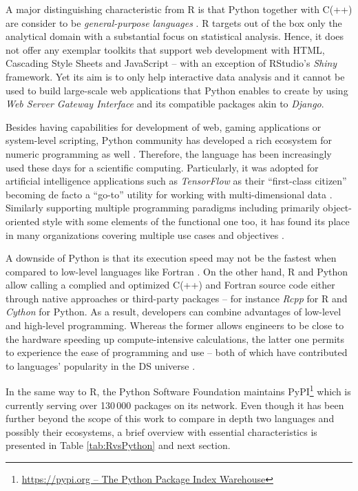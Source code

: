 A major distinguishing characteristic from R is that Python together with C(++) are consider to be \emph{general-purpose languages} \parencite{Cass2017,TeachingDS2016}.
R targets out of the box only the analytical domain with a substantial focus on statistical analysis. 
Hence, it does not offer any exemplar toolkits that support web development with \ac{HTML}, Cascading Style Sheets and JavaScript -- with an exception of RStudio's \emph{Shiny} framework. 
Yet its aim is to only help interactive data analysis and it cannot be used to build large-scale web applications that Python enables to create by using \emph{Web Server Gateway Interface} and its compatible packages akin to \emph{Django}.

Besides having capabilities for development of web, gaming applications or system-level scripting, Python community has developed a rich ecosystem for numeric programming as well \parencite{PythonCoreTeam2017GraphicFAQ}. 
Therefore, the language has been increasingly used these days for a scientific computing. 
Particularly, it was adopted for artificial intelligence applications such as \emph{TensorFlow} as their \enquote{first-class citizen} becoming de facto a \enquote{go-to} utility for working with multi-dimensional data \parencite{PDLMLRaschka2016}.
Similarly supporting multiple programming paradigms including primarily object-oriented style with some elements of the functional one too, it has found its place in many organizations covering multiple use cases and objectives \parencite{RamlhoLucFPython2015}.

A downside of Python is that its execution speed may not be the fastest when compared to low-level languages like Fortran \parencite{Lutz2013}.
On the other hand, R and Python allow calling a complied and optimized C(++) and Fortran source code either through native approaches or third-party packages -- for instance \emph{Rcpp} for R and \emph{Cython} for Python. 
As a result, developers can combine advantages of low-level and high-level programming. 
Whereas the former allows engineers to be close to the hardware speeding up compute-intensive calculations, the latter one permits to experience the ease of programming and use -- both of which have contributed to languages' popularity in the \ac{DS} universe \parencites{Perez2011Python:Computing}{JakeVanderPlas2016PythonHandbook}.

In the same way to R, the Python Software Foundation maintains \ac{PyPI}\footnote{\href{https://pypi.org/}{https://pypi.org -- The Python Package Index Warehouse}} which is currently serving over 130\,000 packages on its network.
Even though it has been further beyond the scope of this work to compare in depth two languages and possibly their ecosystems, a brief overview with essential characteristics is presented in Table \ref{tab:RvsPython} and next section.

